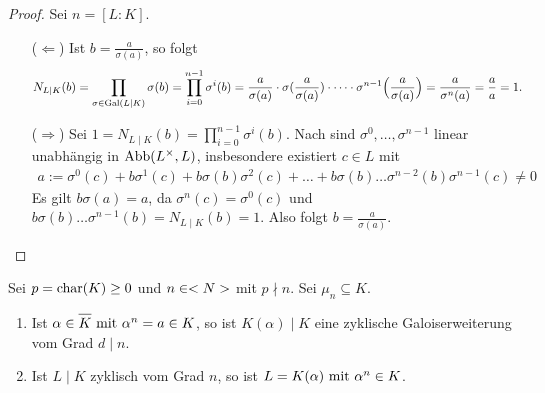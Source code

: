 \begin{proof}
	Sei $n= [L:K]$.
	\begin{itemize}[topsep=-6pt]
		\item[($\Leftarrow$)]
		Ist $b = \frac{a}{\sigma(a)}$, so folgt \begin{align*}
			N_{L\mid K} (b) &= \prod_{\sigma \in \Gal(L\mid K)} \sigma(b)
			= \prod_{i=0}^{n-1} \sigma^i(b) = \frac{a}{\sigma(a)}\cdot \sigma(\frac{a}{\sigma(a)})\cdot \dots \cdot  \sigma^{n-1}\Big(\frac{a}{\sigma(a)}\Big)
			= \frac{a}{\sigma^n(a)} = \frac{a}{a} = 1.
		\end{align*}
		\item[($\Rightarrow$)] Sei $1 = N_{L\mid K}(b) = \prod_{i=0}^{n-1} \sigma^i(b)$. Nach  sind $\sigma^0, \dots, \sigma^{n-1}$ linear unabhängig in $\Abb(L^{\times},L)$, insbesondere existiert $c \in L$ mit 
		\begin{align*}
			a:= \sigma^0(c) + b\sigma^1(c) + b\sigma(b)\sigma^2(c) + \dots + b \sigma(b)\dots\sigma^{n-2}(b)\sigma^{n-1}(c) \neq 0
		\end{align*}
		Es gilt $b\sigma(a) = a$, da $\sigma^n(c) = \sigma^0(c)$ und $b\sigma(b)\dots \sigma^{n-1}(b) = N_{L\mid K}(b) = 1$. Also folgt $b = \frac{a}{\sigma(a)}$.
	\end{itemize}
\end{proof}
\begin{proposition}[Kummer]
	Sei $p = \chara(K) \ge 0$ und $n \in \N$ mit $p \nmid n$. Sei $\mu_n \subseteq K$.
	\begin{enumerate}[label={(\alph*)}]
		\item Ist $\alpha \in \overline{K} \mit \alpha^n = a \in K$, so ist $K(\alpha) \mid K$ eine zyklische Galoiserweiterung vom Grad $d \mid n$.
		\item Ist $L \mid K$ zyklisch vom Grad $n$, so ist $L = K(\alpha) \mit \alpha^n \in K$.
	\end{enumerate}
\end{proposition}
